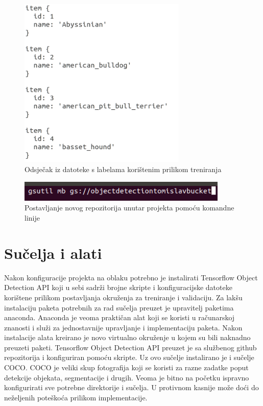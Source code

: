 \begin{figure}[ht]
    \centering
    \includegraphics[width=8cm]{img/pet_labels.png}
    \caption{Odsječak iz datoteke s labelama korištenim prilikom treniranja}
    \label{Pet labels}
\end{figure}

\begin{figure}[htb]
    \centering
    \includegraphics[width=10cm]{img/Gsutil.png}
    \caption{Postavljanje novog repozitorija unutar projekta pomoću komandne linije}
    \label{Gsutil}
\end{figure}

\section{Sučelja i alati}
Nakon konfiguracije projekta na oblaku potrebno je instalirati Tensorflow Object Detection API koji u sebi sadrži brojne skripte i konfiguracijske datoteke korištene prilikom postavljanja okruženja za treniranje i validaciju. 
Za lakšu instalaciju paketa potrebnih za rad sučelja preuzet je upravitelj paketima anaconda. Anaconda je veoma praktičan alat koji se koristi u računarskoj znanosti i služi za jednostavnije upravljanje i implementaciju paketa. 
Nakon instalacije alata kreirano je novo virtualno okruženje u kojem su bili naknadno preuzeti paketi. Tensorflow Object Detection API preuzet je sa službenog github repozitorija i konfiguriran pomoću skripte.
Uz ovo sučelje instalirano je i sučelje COCO. COCO je veliki skup fotografija koji se koristi za razne zadatke poput detekcije objekata, segmentacije i drugih.
Veoma je bitno na početku ispravno konfigurirati sve potrebne direktorije i sučelja. U protivnom kasnije može doći do neželjenih poteškoća prilikom implementacije.

